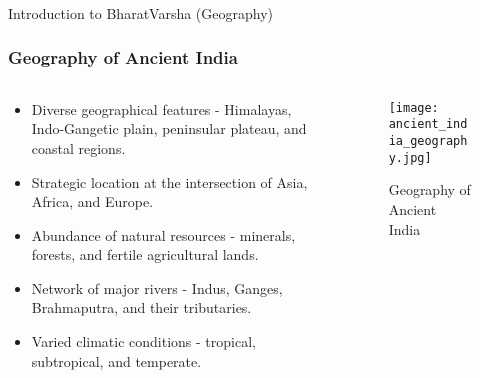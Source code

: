 \begin{frame}[fragile]\frametitle{}
\begin{center}
{\Large Introduction to BharatVarsha (Geography)}
\end{center}
\end{frame}

\begin{frame}[fragile]\frametitle{Geography of Ancient India}
\begin{columns}
\begin{column}{0.5\textwidth}
\begin{itemize}
   \item Diverse geographical features - Himalayas, Indo-Gangetic plain, peninsular plateau, and coastal regions.
   \item Strategic location at the intersection of Asia, Africa, and Europe.
   \item Abundance of natural resources - minerals, forests, and fertile agricultural lands.
   \item Network of major rivers - Indus, Ganges, Brahmaputra, and their tributaries.
   \item Varied climatic conditions - tropical, subtropical, and temperate.
\end{itemize}

\end{column}
\begin{column}{0.5\textwidth}
\begin{figure}
   \texttt{[image: ancient\_india\_geography.jpg]}
   \caption{Geography of Ancient India}
\end{figure}
\end{column}
\end{columns}
\end{frame}

